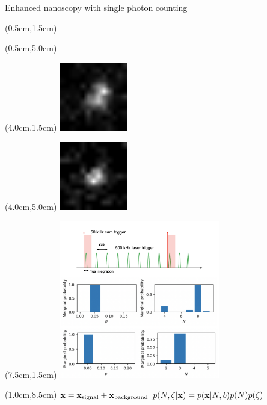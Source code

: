 \documentclass{beamer}					%
\begin{document}
\begin{frame}{Enhanced nanoscopy with single photon counting}
\begin{textblock*}{3cm}(0.5cm,1.5cm)
\end{textblock*}
\begin{textblock*}{3cm}(0.5cm,5.0cm)
\end{textblock*}
\begin{textblock*}{3cm}(4.0cm,1.5cm)
\includegraphics[width=3cm]{media/spad-snip1-sum.png}
\end{textblock*}
\begin{textblock*}{3cm}(4.0cm,5.0cm)
\includegraphics[width=3cm]{media/spad-snip2-sum.png}
\end{textblock*}
\begin{textblock*}{7cm}(7.5cm,1.5cm)
\includegraphics[width=7cm]{media/Counting.png}
\end{textblock*}
\begin{textblock*}{12cm}(1.0cm,8.5cm)
$\bold{x} = \bold{x}_{\mathrm{signal}} + \bold{x}_{\mathrm{background}} \;\; p(N,\zeta|\bold{x}) = p(\bold{x}|N,b)p(N)p(\zeta)$ 
\end{textblock*}
\end{frame}
\end{document}
